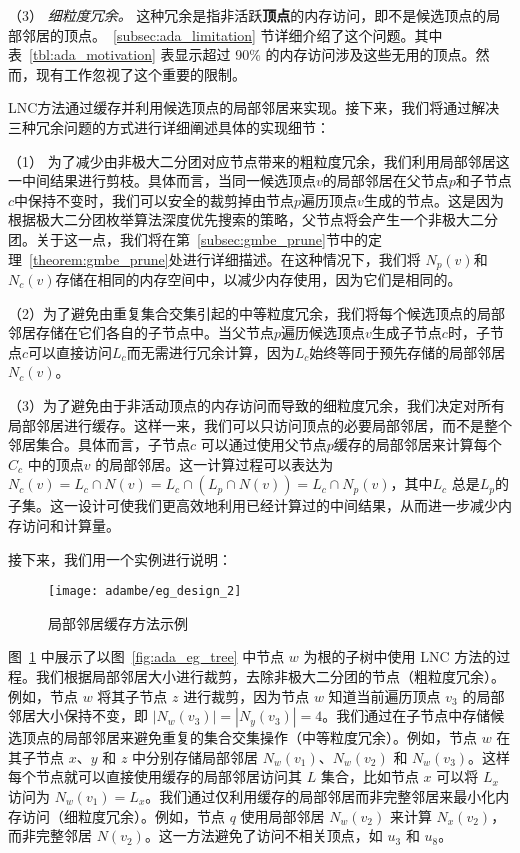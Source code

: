 （3） \emph{\textit{细粒度冗余。}}
这种冗余是指非活跃\textbf{顶点}的内存访问，即不是候选顶点的局部邻居的顶点。~\ref{subsec:ada_limitation} 节详细介绍了这个问题。其中表~\ref{tbl:ada_motivation} 表显示超过 90\% 的内存访问涉及这些无用的顶点。然而，现有工作忽视了这个重要的限制。

LNC方法通过缓存并利用候选顶点的局部邻居来实现。接下来，我们将通过解决三种冗余问题的方式进行详细阐述具体的实现细节：

（1） 为了减少由非极大二分团对应节点带来的粗粒度冗余，我们利用局部邻居这一中间结果进行剪枝。具体而言，当同一候选顶点$v$的局部邻居在父节点$p$和子节点$c$中保持不变时，我们可以安全的裁剪掉由节点$p$遍历顶点$v$生成的节点。这是因为根据极大二分团枚举算法深度优先搜索的策略，父节点将会产生一个非极大二分团。关于这一点，我们将在第~\ref{subsec:gmbe_prune}节中的定理~\ref{theorem:gmbe_prune}处进行详细描述。在这种情况下，我们将 $N_p(v)$和$N_c(v)$存储在相同的内存空间中，以减少内存使用，因为它们是相同的。

（2）为了避免由重复集合交集引起的中等粒度冗余，我们将每个候选顶点的局部邻居存储在它们各自的子节点中。当父节点$p$遍历候选顶点$v$生成子节点$c$时，子节点$c$可以直接访问$L_c$而无需进行冗余计算，因为$L_c$始终等同于预先存储的局部邻居 $N_c(v)$。

（3）为了避免由于非活动顶点的内存访问而导致的细粒度冗余，我们决定对所有局部邻居进行缓存。这样一来，我们可以只访问顶点的必要局部邻居，而不是整个邻居集合。具体而言，子节点$c$ 可以通过使用父节点$p$缓存的局部邻居来计算每个$C_c$ 中的顶点$v$ 的局部邻居。这一计算过程可以表达为$N_c(v) = L_c \cap N(v) = L_c \cap (L_p \cap N(v)) = L_c \cap N_p(v)$，其中$L_c$ 总是$L_p$的子集。这一设计可使我们更高效地利用已经计算过的中间结果，从而进一步减少内存访问和计算量。

接下来，我们用一个实例进行说明：

\begin{figure} [H]
	\centering
  \vspace{0.05in}
	\texttt{[image: adambe/eg\_design\_2]}
	\caption{局部邻居缓存方法示例}

	\label{fig:ada_design2}
\end{figure}

\begin{example}
  图~\ref{fig:ada_design2} 中展示了以图~\ref{fig:ada_eg_tree} 中节点 $w$ 为根的子树中使用 LNC 方法的过程。我们根据局部邻居大小进行裁剪，去除非极大二分团的节点（粗粒度冗余）。例如，节点 $w$ 将其子节点 $z$ 进行裁剪，因为节点 $w$ 知道当前遍历顶点 $v_3$ 的局部邻居大小保持不变，即 $|N_w(v_3)| = |N_y(v_3)| = 4$。我们通过在子节点中存储候选顶点的局部邻居来避免重复的集合交集操作（中等粒度冗余）。例如，节点 $w$ 在其子节点 $x$、$y$ 和 $z$ 中分别存储局部邻居 $N_w(v_1)$、$N_w(v_2)$ 和 $N_w(v_3)$。这样每个节点就可以直接使用缓存的局部邻居访问其 $L$ 集合，比如节点 $x$ 可以将 $L_x$ 访问为 $N_w(v_1)=L_x$。我们通过仅利用缓存的局部邻居而非完整邻居来最小化内存访问（细粒度冗余）。例如，节点 $q$ 使用局部邻居 $N_w(v_2)$ 来计算 $N_x(v_2)$，而非完整邻居 $N(v_2)$。这一方法避免了访问不相关顶点，如 $u_3$ 和 $u_8$。
\end{example}


